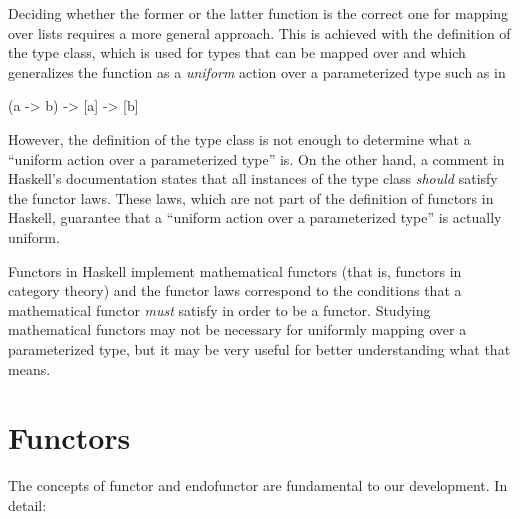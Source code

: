 Deciding whether the former or the latter  function
is the correct one for mapping over lists requires a more general
approach. This is achieved with the definition of the
 type class, which is used for types that can be
mapped over and which generalizes the  function as a
\emph{uniform} action over a parameterized type such as
\texthaskell{[a]} in
\begin{codehaskell}
(a -> b) -> [a] -> [b]
\end{codehaskell}

However, the definition of the  type class is not
enough to determine what a ``uniform action over a parameterized
type'' is. On the other hand, a comment in Haskell's documentation
states that all instances of the  type class
\emph{should} satisfy the functor laws. These laws, which are not part
of the definition of functors in Haskell, guarantee that a ``uniform
action over a parameterized type'' is actually uniform.

Functors in Haskell implement mathematical functors (that is, functors
in category theory) and the functor laws correspond to the conditions
that a mathematical functor \emph{must} satisfy in order to be a
functor. Studying mathematical functors may not be necessary for
uniformly mapping over a parameterized type, but it may be very useful
for better understanding what that means.

\section{Functors}
\label{sec:functors}

The concepts of functor and endofunctor are fundamental to our
development. In detail:

